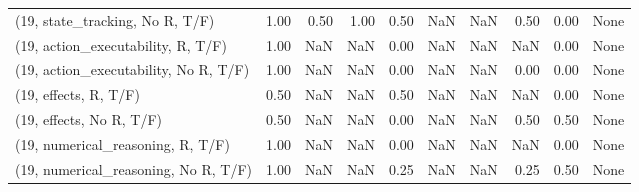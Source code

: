 \begin{table*}[h!]
\begin{adjustbox}{width=2\columnwidth,center}
\begin{tabular}{lrrr|rrr|rrr}
(19, state\_tracking, No R, T/F)       &                      1.00 &                  0.50 &                      1.00 &                          0.50 &                       NaN &                           NaN &                                   0.50 &                               0.00 &                                  None \\
(19, action\_executability, R, T/F)    &                      1.00 &                   NaN &                       NaN &                          0.00 &                       NaN &                           NaN &                                    NaN &                               0.00 &                                  None \\
(19, action\_executability, No R, T/F) &                      1.00 &                   NaN &                       NaN &                          0.00 &                       NaN &                           NaN &                                   0.00 &                               0.00 &                                  None \\
(19, effects, R, T/F)                 &                      0.50 &                   NaN &                       NaN &                          0.50 &                       NaN &                           NaN &                                    NaN &                               0.00 &                                  None \\
(19, effects, No R, T/F)              &                      0.50 &                   NaN &                       NaN &                          0.00 &                       NaN &                           NaN &                                   0.50 &                               0.50 &                                  None \\
(19, numerical\_reasoning, R, T/F)     &                      1.00 &                   NaN &                       NaN &                          0.00 &                       NaN &                           NaN &                                    NaN &                               0.00 &                                  None \\
(19, numerical\_reasoning, No R, T/F)  &                      1.00 &                   NaN &                       NaN &                          0.25 &                       NaN &                           NaN &                                   0.25 &                               0.50 &                                  None \\

\end{tabular}
\end{adjustbox}
\end{table*}
